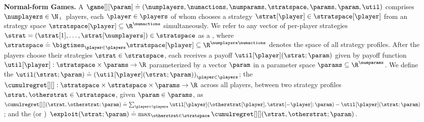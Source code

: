 


\textbf{Normal-form Games. } 
A  $\game[][\param] \doteq (\numplayers, \numactions, \numparams, \stratspace, \params, \param, \util)$ 
comprises $\numplayers \in \N_+$ players, each $\player \in \players$ of whom chooses a strategy $\strat[\player] \in \stratspace[\player]$ from an strategy space $\stratspace[\player] \subseteq \R^{\numactions}$ simultaneously.
We refer to any vector of per-player strategies $\strat = (\strat[1], \hdots, \strat[\numplayers]) \in \stratspace$ as a , where 
$\stratspace \doteq \bigtimes_{\player \in \players} \stratspace[\player] \subseteq \R^{\numplayers \numactions}$ denotes the space of all strategy profiles.
%
After the players choose their strategies $\strat \in \stratspace$, each receives a payoff $\util[\player](\strat; \param)$ given by payoff function $\util[\player]: \stratspace \times \params \to \R$ parameterized by a vector $\param$ in a parameter space $\params \subseteq \R^\numparams$.
We define the  $\util(\strat; \param) \doteq \left( \util[\player](\strat; \param) \right)_{\player \in \players}$;
the  $\cumulregret[][]: \stratspace \times \stratspace \times \params \to \R$ across all players, between two strategy profiles $\strat, \otherstrat \in \stratspace$, given $\param \in \params$, as $\cumulregret[][] (\strat, \otherstrat; \param) \doteq \sum_{\player \in \players} \util[\player](\otherstrat[\player], \strat[-\player]; \param) - \util[\player](\strat; \param)$;
and the  (or  \citep{nikaido1955note}) $\exploit (\strat; \param) \doteq \max_{\otherstrat \in \stratspace} \cumulregret[][] (\strat, \otherstrat; \param)$.

